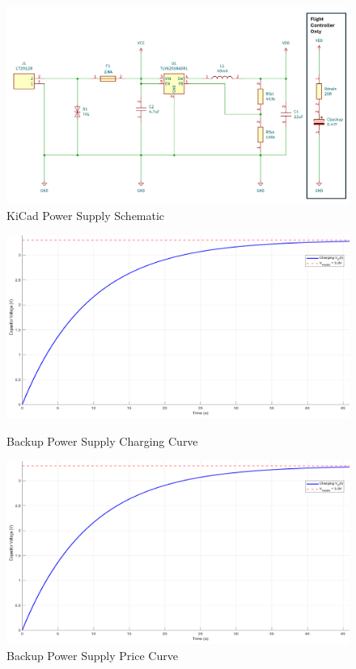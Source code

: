 \begin{figure}[ht]
  \centering
  \includegraphics[width=\textwidth]{figs/Thomas/Custom Hardware/Power Supply.png}
  \caption{KiCad Power Supply Schematic}
  \label{fig:power_supply_schematic}
\end{figure}



\begin{figure}[ht]
 \centering
 \begin{minipage}[t]{0.48\textwidth}
  \centering
  \includegraphics[width=\textwidth]{figs/Thomas/Custom Hardware/charging_curve.png}
  \caption{Backup Power Supply Charging Curve}
  \label{fig:charging_curve}
 \end{minipage}
 \hfill
 \begin{minipage}[t]{0.48\textwidth}
  \centering
  \includegraphics[width=\textwidth]{figs/Thomas/Custom Hardware/charging_curve.png}
  \caption{Backup Power Supply Price Curve}
  \label{fig:price_curve}
 \end{minipage}
\end{figure}



